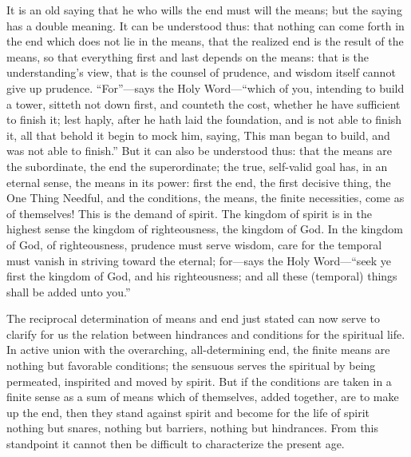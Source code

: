 \documentclass[12pt]{book}
\newcommand{\opage}[1]{\marginnote{\footnotesize\textit{[#1]}}}
\begin{document}
It is an old saying that he who wills the end must will the means; but
the saying has a double meaning. It can be understood thus: that nothing
can come forth in the end which does not lie in the means, that the
realized end is the result of the means, so that everything first and
last depends on the means: that is the understanding's view, that is
the counsel of prudence, and wisdom itself cannot give up prudence.
``For''---says the Holy Word---``which of you, intending to build a
tower, sitteth not down first, and counteth the cost, whether he have
sufficient to finish it; lest haply, after he hath laid the foundation,
and is not able to finish it, all that behold it begin to mock him,
saying, This man began to build, and was not able to finish.'' But it
can also be understood thus: that the means are the subordinate, the
end the superordinate; the true, self-valid goal has, in an eternal
sense, the means in its power: first the end, the first decisive thing,
the One Thing Needful, and the conditions, the means, the finite
necessities, come as of themselves! This is the demand of spirit. The
kingdom of spirit is in the highest sense the kingdom of righteousness,
the kingdom of God. In the kingdom of God, of
\opage{3}\setcounter{footnote}{0}%
righteousness, prudence must serve wisdom, care for the temporal must
vanish in striving toward the eternal; for---says the Holy
Word---``seek ye first the kingdom of God, and his righteousness; and
all these (temporal) things shall be added unto you.''

The reciprocal determination of means and end just stated can now serve
to clarify for us the relation between hindrances and conditions for
the spiritual life. In active union with the overarching, all-determining
end, the finite means are nothing but favorable conditions; the sensuous
serves the spiritual by being permeated, inspirited and moved by spirit.
But if the conditions are taken in a finite sense as a sum of means
which of themselves, added together, are to make up the end, then they
stand against spirit and become for the life of spirit nothing but
snares, nothing but barriers, nothing but hindrances. From this
standpoint it cannot then be difficult to characterize the present age.
\end{document}
